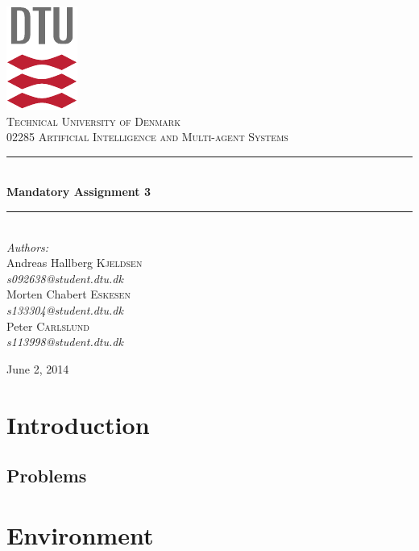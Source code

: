 \documentclass[11pt]{article}
\newcommand{\HRule}{\rule{\linewidth}{0.5mm}}
\begin{document}
\begin{titlepage}
\begin{center}

\includegraphics[scale=2.0]{../GFX/dtu_logo.pdf}\\[1cm]

\textsc{\LARGE Technical University of Denmark}\\[1.5cm]

\textsc{\Large 02285 Artificial Intelligence and Multi-agent Systems}\\[0.5cm]

\HRule \\[0.4cm]
{\huge \bfseries Mandatory Assignment 3}\\[0.1cm]
\HRule \\[1.5cm]

\large
\emph{Authors:}
\\[10pt]
Andreas Hallberg \textsc{Kjeldsen}\\
\emph{s092638@student.dtu.dk}
\\[10pt]
Morten Chabert \textsc{Eskesen}\\
\emph{s133304@student.dtu.dk}
\\[10pt]
Peter \textsc{Carlslund}\\
\emph{s113998@student.dtu.dk}

\vfill

{\large June 2, 2014}

\end{center}
\end{titlepage}

\section{Introduction}

\subsection{Problems}

\section{Environment}
\end{document}
